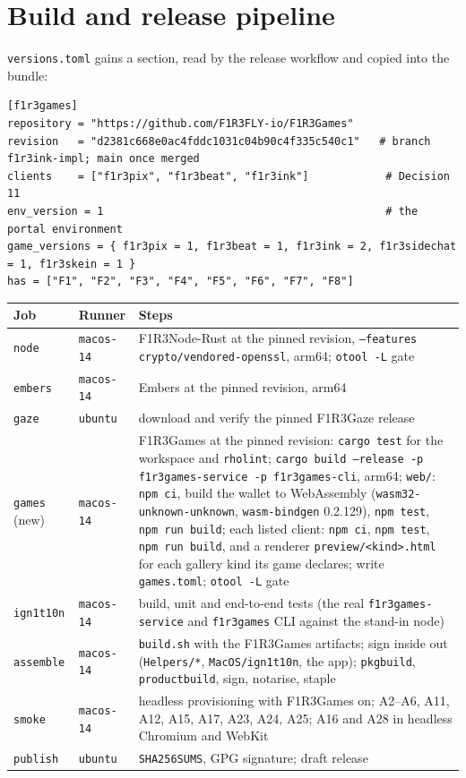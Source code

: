 \documentclass[11pt]{article}
\theoremstyle{definition}
\theoremstyle{remark}
\newcommand{\code}[1]{\texttt{#1}}
\newcommand{\Gz}{F1R3Gaze}
\newcommand{\Nd}{F1R3Node-Rust}
\newcommand{\Gm}{F1R3Games}
\newcommand{\Svc}{\code{f1r3games-service}}
\newcommand{\Em}{Embers}
\begin{document}
\section{Build and release pipeline}\label{sec:pipeline}

\code{versions.toml} gains a section, read by the release workflow and copied into
the bundle:

\begin{lstlisting}[language=Conf]
[f1r3games]
repository = "https://github.com/F1R3FLY-io/F1R3Games"
revision   = "d2381c668e0ac4fddc1031c04b90c4f335c540c1"   # branch f1r3ink-impl; main once merged
clients    = ["f1r3pix", "f1r3beat", "f1r3ink"]            # Decision 11
env_version = 1                                            # the portal environment
game_versions = { f1r3pix = 1, f1r3beat = 1, f1r3ink = 2, f1r3sidechat = 1, f1r3skein = 1 }
has = ["F1", "F2", "F3", "F4", "F5", "F6", "F7", "F8"]
\end{lstlisting}

\begin{center}\small
\renewcommand{\arraystretch}{1.15}
\begin{tabularx}{\linewidth}{@{}p{2.0cm}p{1.9cm}X@{}}
\toprule
Job & Runner & Steps\\
\midrule
\code{node} & \code{macos-14} & \Nd{} at the pinned revision, \code{--features crypto/vendored-openssl}, arm64; \code{otool -L} gate\\
\code{embers} & \code{macos-14} & \Em{} at the pinned revision, arm64\\
\code{gaze} & \code{ubuntu} & download and verify the pinned \Gz{} release\\
\code{games} (new) & \code{macos-14} & \Gm{} at the pinned revision: \code{cargo test} for the workspace and \code{rholint}; \code{cargo build --release -p f1r3games-service -p f1r3games-cli}, arm64; \code{web/}: \code{npm ci}, build the wallet to WebAssembly (\code{wasm32-unknown-unknown}, \code{wasm-bindgen} 0.2.129), \code{npm test}, \code{npm run build}; each listed client: \code{npm ci}, \code{npm test}, \code{npm run build}, and a renderer \code{preview/<kind>.html} for each gallery kind its game declares; write \code{games.toml}; \code{otool -L} gate\\
\code{ign1t10n} & \code{macos-14} & build, unit and end-to-end tests (the real \Svc{} and \code{f1r3games} CLI against the stand-in node)\\
\code{assemble} & \code{macos-14} & \code{build.sh} with the \Gm{} artifacts; sign inside out (\code{Helpers/*}, \code{MacOS/ign1t10n}, the app); \code{pkgbuild}, \code{productbuild}, sign, notarise, staple\\
\code{smoke} & \code{macos-14} & headless provisioning with \Gm{} on; A2--A6, A11, A12, A15, A17, A23, A24, A25; A16 and A28 in headless Chromium and WebKit\\
\code{publish} & \code{ubuntu} & \code{SHA256SUMS}, GPG signature; draft release\\
\bottomrule
\end{tabularx}
\end{center}
\end{document}
